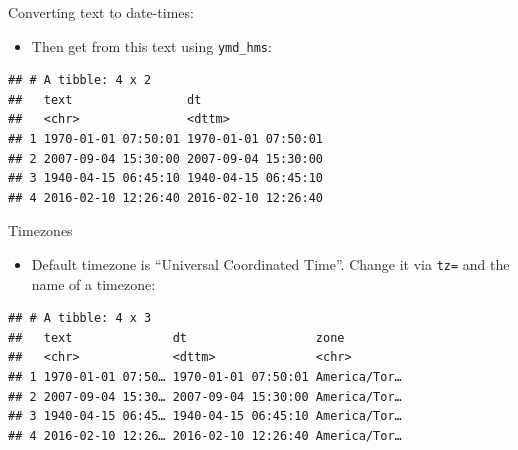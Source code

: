 \documentclass[
  ignorenonframetext,
]{beamer}
\newenvironment{Shaded}{\begin{snugshade}}{\end{snugshade}}
\newcommand{\DataTypeTok}[1]{\textcolor[rgb]{0.13,0.29,0.53}{#1}}
\newcommand{\KeywordTok}[1]{\textcolor[rgb]{0.13,0.29,0.53}{\textbf{#1}}}
\newcommand{\NormalTok}[1]{#1}
\newcommand{\OperatorTok}[1]{\textcolor[rgb]{0.81,0.36,0.00}{\textbf{#1}}}
\newcommand{\StringTok}[1]{\textcolor[rgb]{0.31,0.60,0.02}{#1}}
\providecommand{\tightlist}{%
  \setlength{\itemsep}{0pt}\setlength{\parskip}{0pt}}
\begin{document}
\begin{frame}[fragile]{Converting text to date-times:}
\protect\hypertarget{converting-text-to-date-times}{}

\begin{itemize}
\tightlist
\item
  Then get from this text using \texttt{ymd\_hms}:
\end{itemize}

\begin{Shaded}
\end{Shaded}

\begin{verbatim}
## # A tibble: 4 x 2
##   text                dt                 
##   <chr>               <dttm>             
## 1 1970-01-01 07:50:01 1970-01-01 07:50:01
## 2 2007-09-04 15:30:00 2007-09-04 15:30:00
## 3 1940-04-15 06:45:10 1940-04-15 06:45:10
## 4 2016-02-10 12:26:40 2016-02-10 12:26:40
\end{verbatim}

\end{frame}

\begin{frame}[fragile]{Timezones}
\protect\hypertarget{timezones}{}

\begin{itemize}
\tightlist
\item
  Default timezone is ``Universal Coordinated Time''. Change it via
  \texttt{tz=} and the name of a timezone:
\end{itemize}

\begin{Shaded}
\end{Shaded}

\begin{verbatim}
## # A tibble: 4 x 3
##   text              dt                  zone        
##   <chr>             <dttm>              <chr>       
## 1 1970-01-01 07:50… 1970-01-01 07:50:01 America/Tor…
## 2 2007-09-04 15:30… 2007-09-04 15:30:00 America/Tor…
## 3 1940-04-15 06:45… 1940-04-15 06:45:10 America/Tor…
## 4 2016-02-10 12:26… 2016-02-10 12:26:40 America/Tor…
\end{verbatim}

\end{frame}
\end{document}
